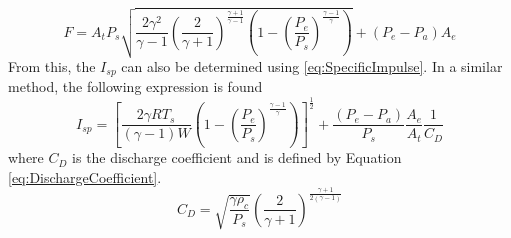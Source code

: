 \begin{equation}\label{eq:TheoreticalForce}
F= A_tP_s\sqrt{\frac{2\gamma^2}{\gamma-1}\left(\frac{2}{\gamma+1}\right)^{\frac{\gamma+1}{\gamma-1}}\left(1-\left(\frac{P_e}{P_s}\right)^{\frac{\gamma-1}{\gamma}}\right)}+\left(P_e-P_a\right)A_e
\end{equation}
From this, the $I_{sp}$ can also be determined using \ref{eq:SpecificImpulse}. In a similar method, the following expression is found
\begin{equation}\label{eq:TheoreticalSpecificImpulse}
I_{sp}=\left[\frac{2\gamma R T_s}{(\gamma-1)W}\left(1-\left(\frac{P_e}{P_s}\right)^{\frac{\gamma-1}{\gamma}}\right)\right]^{\frac{1}{2}}+\frac{(P_e-P_a)}{P_s}\frac{A_e}{A_t}\frac{1}{C_D}
\end{equation}
where $C_D$ is the discharge coefficient and is defined by Equation \ref{eq:DischargeCoefficient}.
\begin{equation}\label{eq:DischargeCoefficient}
C_D=\sqrt{\frac{\gamma \rho_c}{P_s}}\left(\frac{2}{\gamma+1}\right)^{\frac{\gamma+1}{2(\gamma-1)}}
\end{equation}%
